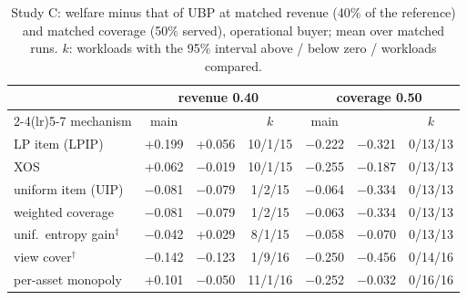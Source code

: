 
\begin{table}[t]
  \centering
  \footnotesize
  \setlength{\tabcolsep}{3pt}
  \caption{Study C: welfare minus that of UBP at matched revenue (40\% of the reference) and matched coverage (50\% served), operational buyer; mean over matched runs. $k$: workloads with the 95\% interval above / below zero / workloads compared.}
  \label{tab:matched}
  \begin{tabular}{@{}lcccccc@{}}
    \toprule
    & \multicolumn{3}{c}{revenue 0.40} & \multicolumn{3}{c}{coverage 0.50} \\
    \cmidrule(lr){2-4}\cmidrule(lr){5-7}
    mechanism & main & \tpch{} & $k$ & main & \tpch{} & $k$ \\
    \midrule
    LP item (LPIP) & +0.199 & +0.056 & 10/1/15 & $-$0.222 & $-$0.321 & 0/13/13 \\
    XOS & +0.062 & $-$0.019 & 10/1/15 & $-$0.255 & $-$0.187 & 0/13/13 \\
    uniform item (UIP) & $-$0.081 & $-$0.079 & 1/2/15 & $-$0.064 & $-$0.334 & 0/13/13 \\
    \qirana{} weighted coverage & $-$0.081 & $-$0.079 & 1/2/15 & $-$0.063 & $-$0.334 & 0/13/13 \\
    \qirana{} unif.\ entropy gain$^{\ddagger}$ & $-$0.042 & +0.029 & 8/1/15 & $-$0.058 & $-$0.070 & 0/13/13 \\
    \querymarket{} view cover$^{\dagger}$ & $-$0.142 & $-$0.123 & 1/9/16 & $-$0.250 & $-$0.456 & 0/14/16 \\
    per-asset monopoly & +0.101 & $-$0.050 & 11/1/16 & $-$0.252 & $-$0.032 & 0/16/16 \\
    \bottomrule
  \end{tabular}
\end{table}
